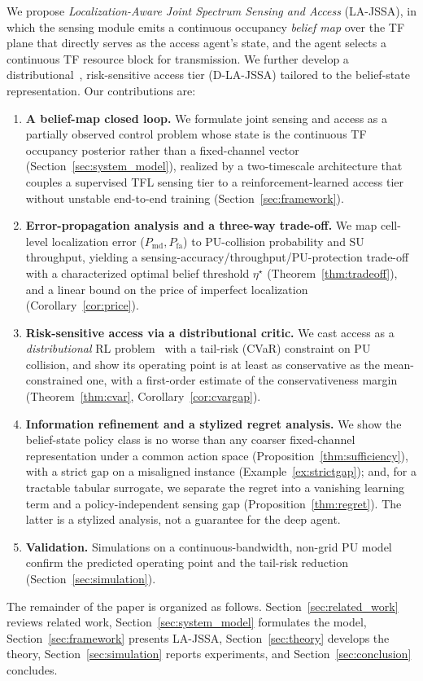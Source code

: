 \documentclass[journal]{IEEEtran}
\newcommand{\Pmd}{P_{\mathrm{md}}}         %
\newcommand{\Pfa}{P_{\mathrm{fa}}}         %
\newcommand{\thr}{\eta}                    %
\begin{document}
We propose \emph{Localization-Aware Joint Spectrum Sensing and Access}
(LA-JSSA), in which the sensing module emits a continuous occupancy
\emph{belief map} over the TF plane that directly serves as the access
agent's state, and the agent selects a continuous TF resource block for
transmission. We further develop a distributional~\cite{dabney2018qrdqn}, risk-sensitive access tier
(D-LA-JSSA) tailored to the belief-state representation. Our contributions
are:
\begin{enumerate}
\item \textbf{A belief-map closed loop.} We formulate joint sensing and
access as a partially observed control problem whose state is the continuous TF occupancy
posterior rather than a fixed-channel vector
(Section~\ref{sec:system_model}), realized by a two-timescale architecture
that couples a supervised TFL sensing tier to a reinforcement-learned access
tier without unstable end-to-end training (Section~\ref{sec:framework}).
\item \textbf{Error-propagation analysis and a three-way trade-off.} We map
cell-level localization error ($\Pmd,\Pfa$) to PU-collision probability and
SU throughput, yielding a sensing-accuracy/throughput/PU-protection
trade-off with a characterized optimal belief threshold $\thr^\star$
(Theorem~\ref{thm:tradeoff}), and a linear bound on the price of imperfect
localization (Corollary~\ref{cor:price}).
\item \textbf{Risk-sensitive access via a distributional critic.} We cast
access as a \emph{distributional} RL problem~\cite{dabney2018qrdqn,ma2020dsac} with a tail-risk (CVaR)
constraint on PU collision, and show its operating point is at least as
conservative as the mean-constrained one, with a first-order estimate of the
conservativeness margin (Theorem~\ref{thm:cvar},
Corollary~\ref{cor:cvargap}).
\item \textbf{Information refinement and a stylized regret analysis.} We show
the belief-state policy class is no worse than any coarser fixed-channel
representation under a common action space
(Proposition~\ref{thm:sufficiency}), with a strict gap on a misaligned
instance (Example~\ref{ex:strictgap}); and, for a tractable tabular
surrogate, we separate the regret into a vanishing learning term and a
policy-independent sensing gap (Proposition~\ref{thm:regret}). The latter is a
stylized analysis, not a guarantee for the deep agent.
\item \textbf{Validation.} Simulations on a continuous-bandwidth, non-grid
PU model confirm the predicted operating point and the tail-risk reduction
(Section~\ref{sec:simulation}).
\end{enumerate}
The remainder of the paper is organized as follows.
Section~\ref{sec:related_work} reviews related work,
Section~\ref{sec:system_model} formulates the model,
Section~\ref{sec:framework} presents LA-JSSA,
Section~\ref{sec:theory} develops the theory,
Section~\ref{sec:simulation} reports experiments, and
Section~\ref{sec:conclusion} concludes.
\end{document}
